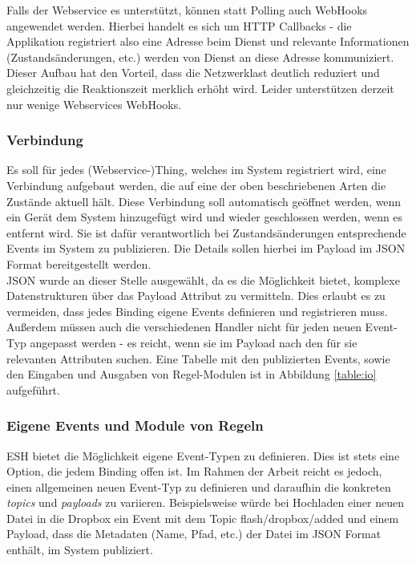 Falls der Webservice es unterstützt, können statt Polling auch WebHooks angewendet werden. Hierbei handelt es sich um HTTP Callbacks - die Applikation registriert also eine Adresse beim Dienst und relevante Informationen (Zustandsänderungen, etc.) werden von Dienst an diese Adresse kommuniziert. Dieser Aufbau hat den Vorteil, dass die Netzwerklast deutlich reduziert und gleichzeitig die Reaktionszeit merklich erhöht wird. Leider unterstützen derzeit nur wenige Webservices WebHooks.

\subsubsection{Verbindung}
Es soll für jedes (Webservice-)Thing, welches im System registriert wird, eine Verbindung aufgebaut werden, die auf eine der oben beschriebenen Arten die Zustände aktuell hält. Diese Verbindung soll automatisch geöffnet werden, wenn ein Gerät dem System hinzugefügt wird und wieder geschlossen werden, wenn es entfernt wird. Sie ist dafür verantwortlich bei Zustandsänderungen entsprechende Events im System zu publizieren. Die Details sollen hierbei im Payload im JSON Format bereitgestellt werden.\\

JSON wurde an dieser Stelle ausgewählt, da es die Möglichkeit bietet, komplexe Datenstrukturen über das Payload Attribut zu vermitteln. Dies erlaubt es zu vermeiden, dass jedes Binding eigene Events definieren und registrieren muss. Außerdem müssen auch die verschiedenen Handler nicht für jeden neuen Event-Typ angepasst werden - es reicht, wenn sie im Payload nach den für sie relevanten Attributen suchen. Eine Tabelle mit den publizierten Events, sowie den Eingaben und Ausgaben von Regel-Modulen ist in Abbildung \ref{table:io} aufgeführt.



\subsubsection{Eigene Events und Module von Regeln}
ESH bietet die Möglichkeit eigene Event-Typen zu definieren. Dies ist stets eine Option, die jedem Binding offen ist. Im Rahmen der Arbeit reicht es jedoch, einen allgemeinen neuen Event-Typ zu definieren und daraufhin die konkreten \textit{topics} und \textit{payloads} zu variieren. Beispielsweise würde bei Hochladen einer neuen Datei in die Dropbox ein Event mit dem Topic \glqq flash/dropbox/added\grqq{} und einem Payload, dass die Metadaten (Name, Pfad, etc.) der Datei im JSON Format enthält, im System publiziert.\\

